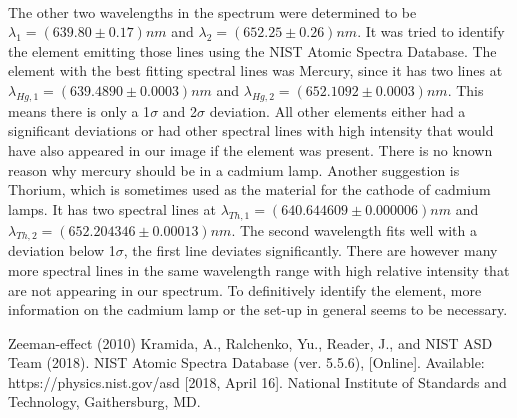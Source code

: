 \documentclass[12pt]{article}
\begin{document}
\\The other two wavelengths in the spectrum were determined to be $\lambda_1=(639.80\pm0.17)nm$ and $\lambda_2=(652.25\pm0.26)nm$. It was tried to identify the element emitting those lines using the NIST Atomic Spectra Database. The element with the best fitting spectral lines was Mercury, since it has two lines at $\lambda_{Hg,1}=(639.4890\pm0.0003)nm$ and $\lambda_{Hg,2}=(652.1092\pm0.0003)nm$. This means there is only a 1$\sigma$ and 2$\sigma$ deviation. All other elements either had a significant deviations or had other spectral lines with high intensity that would have also appeared in our image if the element was present. There is no known reason why mercury should be in a cadmium lamp. Another suggestion is Thorium, which is sometimes used as the material for the cathode of cadmium lamps. It has two spectral lines at $\lambda_{Th,1}=(640.644609\pm0.000006)nm$ and $\lambda_{Th,2}=(652.204346\pm0.00013)nm$. The second wavelength fits well with a deviation below 1$\sigma$, the first line deviates significantly. There are however many more spectral lines in the same wavelength range with high relative intensity that are not appearing in our spectrum. To definitively identify the element, more information on the cadmium lamp or the set-up in general seems to be necessary. 



\newpage
\begin{thebibliography}{00}   %

 Zeeman-effect (2010)
 Kramida, A., Ralchenko, Yu., Reader, J., and NIST ASD Team (2018). NIST Atomic Spectra Database (ver. 5.5.6), [Online]. Available: https://physics.nist.gov/asd [2018, April 16]. National Institute of Standards and Technology, Gaithersburg, MD. 

\end{thebibliography}
\end{document}
